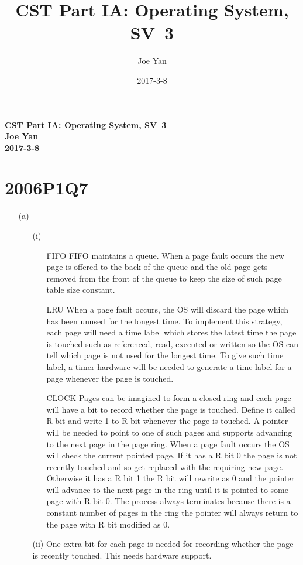 \documentclass[10pt,twoside,a4paper]{article}
\newcommand{\studentname}{Joe Yan}
\newcommand{\svworkdate}{2017-3-8}
\newcommand{\svcourse}{CST Part IA: Operating System}
\newcommand{\svnumber}{3}
\begin{document}
\author{\studentname}
\title{\svcourse, SV~\svnumber}
\date{\svworkdate}

\textbf{\svcourse, SV~\svnumber}\\
\textbf{\studentname}\\
\textbf{\svworkdate}\\

\section{2006P1Q7}
\begin{itemize}
\item[(a)]
\begin{itemize}
\item[(i)]
\begin{itemize}
\item[FIFO] 
FIFO maintains a queue. When a page fault occurs the new page is offered to the back of the queue and the old page gets removed from the front of the queue to keep the size of such page table size constant.
\item[LRU]
When a page fault occurs, the OS will discard the page which has been unused for the longest time. To implement this strategy, each page will need a time label which stores the latest time the page is touched such as referenced, read, executed or written so the OS can tell which page is not used for the longest time. To give such time label, a timer hardware will be needed to generate a time label for a page whenever the page is touched.
\item[CLOCK]
Pages can be imagined to form a closed ring and each page will have a bit to record whether the page is touched. Define it called R bit and write 1 to R bit whenever the page is touched. A pointer will be needed to point to one of such pages and supports advancing to the next page in the page ring.  When a page fault occurs the OS will check the current pointed page. If it has a R bit 0 the page is not recently touched and so get replaced with the requiring new page. Otherwise it has a R bit 1 the R bit will rewrite as 0 and the pointer will advance to the next page in the ring until it is pointed to some page with R bit 0. The process always terminates because there is a constant number of pages in the ring the pointer will always return to the page with R bit modified as 0.
\end{itemize}
\item[(ii)]
One extra bit for each page is needed for recording whether the page is recently touched. This needs hardware support.

\end{itemize}
\end{itemize}
\end{document}
